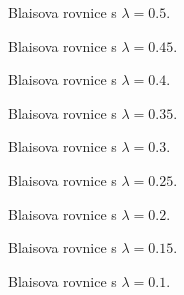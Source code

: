 \documentclass[landscape]{article}
\begin{document}
\fontsize{10pt}{15pt}\selectfont


\begin{figure}[h]
	\centering
	\def\svgwidth{\textwidth}
	
	\caption{Blaisova rovnice s $\lambda = 0.5$.}
\end{figure}

\begin{figure}[h]
	\centering
	\def\svgwidth{\textwidth}
	
	\caption{Blaisova rovnice s $\lambda = 0.45$.}
\end{figure}

\begin{figure}[h]
	\centering
	\def\svgwidth{\textwidth}
	
	\caption{Blaisova rovnice s $\lambda = 0.4$.}
\end{figure}

\begin{figure}[h]
	\centering
	\def\svgwidth{\textwidth}
	
	\caption{Blaisova rovnice s $\lambda = 0.35$.}
\end{figure}

\begin{figure}[h]
	\centering
	\def\svgwidth{\textwidth}
	
	\caption{Blaisova rovnice s $\lambda = 0.3$.}
\end{figure}

\begin{figure}[h]
	\centering
	\def\svgwidth{\textwidth}
	
	\caption{Blaisova rovnice s $\lambda = 0.25$.}
\end{figure}

\begin{figure}[h]
	\centering
	\def\svgwidth{\textwidth}
	
	\caption{Blaisova rovnice s $\lambda = 0.2$.}
\end{figure}

\begin{figure}[h]
	\centering
	\def\svgwidth{\textwidth}
	
	\caption{Blaisova rovnice s $\lambda = 0.15$.}
\end{figure}

\begin{figure}[h]
	\centering
	\def\svgwidth{\textwidth}
	
	\caption{Blaisova rovnice s $\lambda = 0.1$.}
\end{figure}
\end{document}
